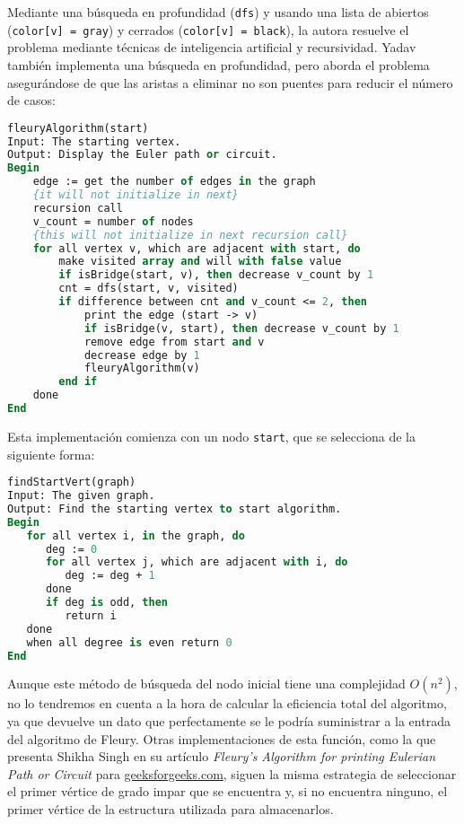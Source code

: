 Mediante una búsqueda en profundidad (\texttt{dfs}) y usando una lista de abiertos (\texttt{color[v] = gray}) y cerrados (\texttt{color[v] = black}), la autora resuelve el problema mediante técnicas de inteligencia artificial y recursividad.
Yadav también implementa una búsqueda en profundidad, pero aborda el problema asegurándose de que las aristas a eliminar no son puentes para reducir el número de casos:

\begin{lstlisting}[language=Pascal]
fleuryAlgorithm(start)
Input: The starting vertex.
Output: Display the Euler path or circuit.
Begin
	edge := get the number of edges in the graph
	{it will not initialize in next}
	recursion call
	v_count = number of nodes
	{this will not initialize in next recursion call}
	for all vertex v, which are adjacent with start, do
		make visited array and will with false value
		if isBridge(start, v), then decrease v_count by 1
		cnt = dfs(start, v, visited)
		if difference between cnt and v_count <= 2, then
			print the edge (start -> v)
			if isBridge(v, start), then decrease v_count by 1
			remove edge from start and v
			decrease edge by 1
			fleuryAlgorithm(v)
		end if
	done
End
\end{lstlisting}

Esta implementación comienza con un nodo \texttt{start}, que se selecciona de la siguiente forma:

\begin{lstlisting}[language=Pascal]
findStartVert(graph)
Input: The given graph.
Output: Find the starting vertex to start algorithm.
Begin
   for all vertex i, in the graph, do
      deg := 0
      for all vertex j, which are adjacent with i, do
         deg := deg + 1
      done
      if deg is odd, then
         return i
   done
   when all degree is even return 0
End
\end{lstlisting}

Aunque este método de búsqueda del nodo inicial tiene una complejidad $O(n^2)$, no lo tendremos en cuenta a la hora de calcular la eficiencia total del algoritmo, ya que devuelve un dato que perfectamente se le podría suministrar a la entrada del algoritmo de Fleury.
Otras implementaciones de esta función, como la que presenta Shikha Singh en su artículo \textit{Fleury’s Algorithm for printing Eulerian Path or Circuit} para \url{geeksforgeeks.com}, siguen la misma estrategia de seleccionar el primer vértice de grado impar que se encuentra y, si no encuentra ninguno, el primer vértice de la estructura utilizada para almacenarlos.

